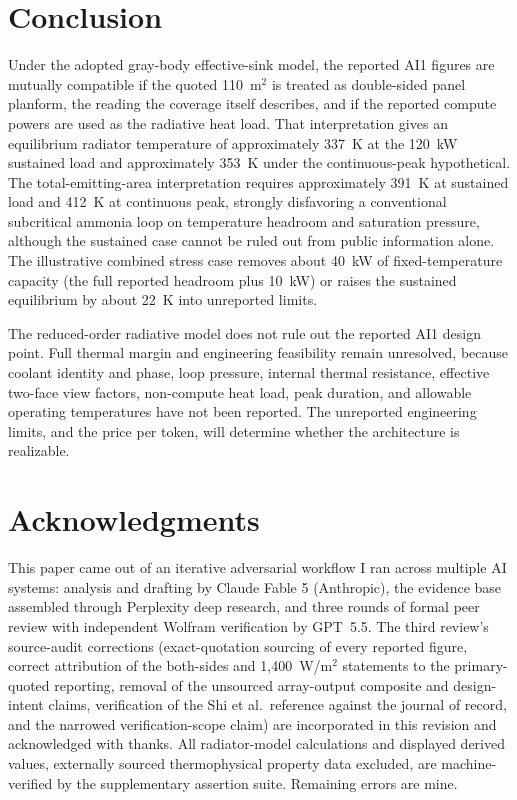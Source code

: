 \documentclass[11pt]{article}
\begin{document}
\section{Conclusion}

Under the adopted gray-body effective-sink model, the reported AI1 figures are mutually compatible if the quoted 110~m$^{2}$ is treated as double-sided panel planform, the reading the coverage itself describes, and if the reported compute powers are used as the radiative heat load. That interpretation gives an equilibrium radiator temperature of approximately 337~K at the 120~kW sustained load and approximately 353~K under the continuous-peak hypothetical. The total-emitting-area interpretation requires approximately 391~K at sustained load and 412~K at continuous peak, strongly disfavoring a conventional subcritical ammonia loop on temperature headroom and saturation pressure, although the sustained case cannot be ruled out from public information alone. The illustrative combined stress case removes about 40~kW of fixed-temperature capacity (the full reported headroom plus 10~kW) or raises the sustained equilibrium by about 22~K into unreported limits.

The reduced-order radiative model does not rule out the reported AI1 design point. Full thermal margin and engineering feasibility remain unresolved, because coolant identity and phase, loop pressure, internal thermal resistance, effective two-face view factors, non-compute heat load, peak duration, and allowable operating temperatures have not been reported. The unreported engineering limits, and the price per token, will determine whether the architecture is realizable.

\section*{Acknowledgments}

This paper came out of an iterative adversarial workflow I ran across multiple AI systems: analysis and drafting by Claude Fable 5 (Anthropic), the evidence base assembled through Perplexity deep research, and three rounds of formal peer review with independent Wolfram verification by GPT~5.5. The third review's source-audit corrections (exact-quotation sourcing of every reported figure, correct attribution of the both-sides and 1,400~W/m$^{2}$ statements to the primary-quoted reporting, removal of the unsourced array-output composite and design-intent claims, verification of the Shi et al.\ reference against the journal of record, and the narrowed verification-scope claim) are incorporated in this revision and acknowledged with thanks. All radiator-model calculations and displayed derived values, externally sourced thermophysical property data excluded, are machine-verified by the supplementary assertion suite. Remaining errors are mine.
\end{document}
